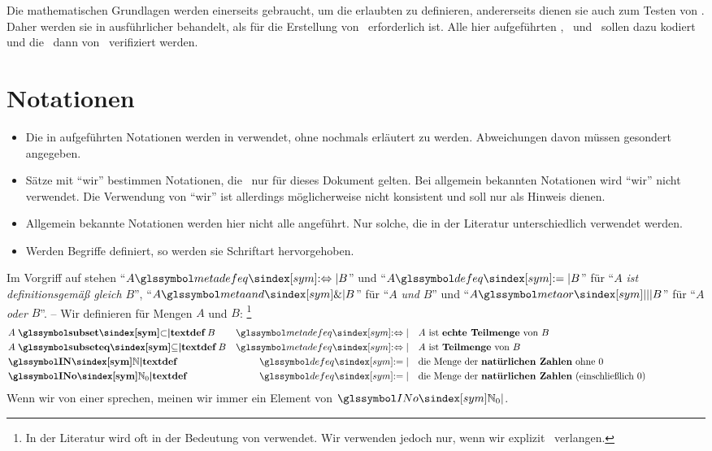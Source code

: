 Die mathematischen Grundlagen werden einerseits gebraucht, um die erlaubten \Beweisschritte{} zu definieren, andererseits dienen sie auch zum Testen von \ASBA.
Daher werden sie in  ausführlicher behandelt, als für die Erstellung von \ASBA\ erforderlich ist.
Alle hier aufgeführten \Axiome, \Saetze\ und \Beweise\ sollen dazu kodiert und die \Beweise\ dann von \ASBA\ verifiziert werden.

\section{Notationen}%
\label{sec:Notationen}

\begin{itemize}
	\item Die in  aufgeführten Notationen werden in  verwendet, ohne nochmals erläutert zu werden. Abweichungen davon müssen gesondert angegeben.
	\item Sätze mit \enquote{wir} bestimmen Notationen, die \textevtl\ nur für dieses Dokument gelten.
	Bei allgemein bekannten Notationen wird \enquote{wir} nicht verwendet.
	Die Verwendung von \enquote{wir} ist allerdings möglicherweise nicht konsistent und soll nur als Hinweis dienen.
	\item Allgemein bekannte Notationen werden hier nicht alle angeführt.
	Nur solche, die in der Literatur unterschiedlich verwendet werden.
	\item Werden Begriffe definiert, so werden sie  Schriftart hervorgehoben.
\end{itemize}
%
Im Vorgriff auf  stehen \enquote{$A \symmetadefeq B$} und \enquote{$A \symdefeq B$} für \enquote{$A$ \emph{ist definitionsgemäß gleich} $B$}, \enquote{$A \symmetaand B$} für \enquote{$A$ \emph{und} $B$} und \enquote{$A \symmetaor B$} für \enquote{$A$ \emph{oder} $B$}.
-- Wir definieren für Mengen $A$ und $B$:%
\footnote{%
	In der Literatur wird \chrqt{\symsubset} oft in der Bedeutung von \chrqt{\symsubseteq} verwendet.
	Wir verwenden \chrqt{\symsubset} jedoch nur, wenn wir explizit \Ungleichheit\ verlangen.
}
%
\begin{align}
	& A \bindefinition{\symsubset}   B & \symmetadefeq \quad &
	\text{$A$ ist \defn{echte Teilmenge} von $B$}
	\label{def:subset}   \\
	& A \bindefinition{\symsubseteq} B & \symmetadefeq \quad &
	\text{$A$ ist       \defn{Teilmenge} von $B$}
	\label{def:subseteq} \\
	&      \definition{\symIN}         &     \symdefeq \quad &
	\text{die Menge der \defn{natürlichen Zahlen}  ohne           $0$}
	\label{def:IN}       \\
	&      \definition{\symINo}        &     \symdefeq \quad &
	\text{die Menge der \defn{natürlichen Zahlen} (einschließlich $0$)}
	\label{def:INo}
	\formulatoleft
\end{align}
Wenn wir von einer  sprechen, meinen wir immer ein Element von $\symINo$.

